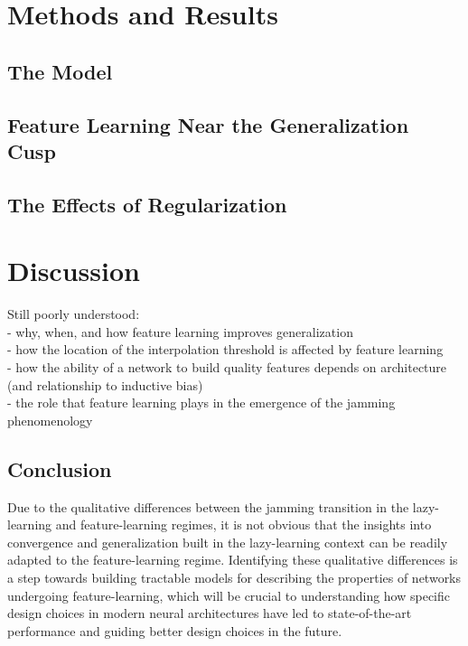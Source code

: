 \documentclass[a4paper, 12pt]{article}
\begin{document}
\section{Methods and Results}
\subsection{The Model}
\subsection{Feature Learning Near the Generalization Cusp}
\subsection{The Effects of Regularization}

\section{Discussion}

Still poorly understood:\\

- why, when, and how feature learning improves generalization\\
- how the location of the interpolation threshold is affected by feature learning\\
- how the ability of a network to build quality features depends on architecture (and relationship to inductive bias) \\
- the role that feature learning plays in the emergence of the jamming phenomenology\\

\subsection{Conclusion}

Due to the qualitative differences between the jamming transition in the lazy-learning and feature-learning regimes, it is not obvious that the insights into convergence and generalization built in the lazy-learning context can be readily adapted to the feature-learning regime. Identifying these qualitative differences is a step towards building tractable models for describing the properties of networks undergoing feature-learning, which will be crucial to understanding how specific design choices in modern neural architectures have led to state-of-the-art performance and guiding better design choices in the future.

\printbibliography
\end{document}
